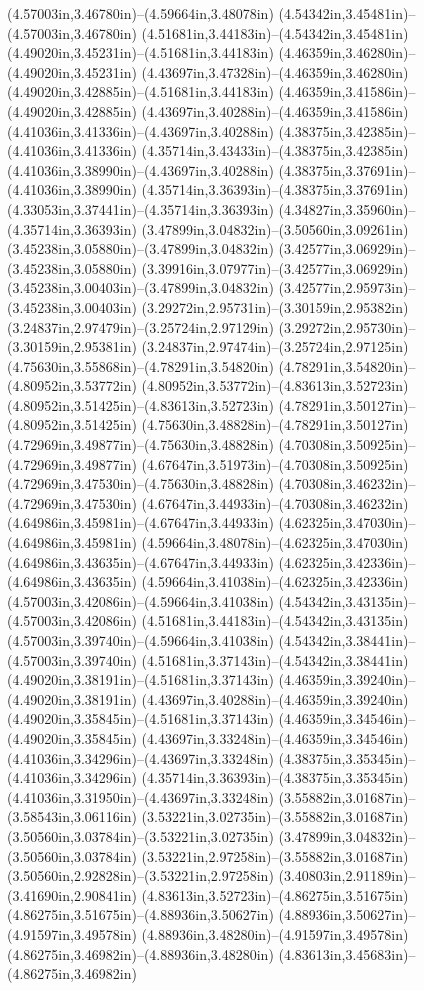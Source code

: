 (4.57003in,3.46780in)--(4.59664in,3.48078in) (4.54342in,3.45481in)--(4.57003in,3.46780in) (4.51681in,3.44183in)--(4.54342in,3.45481in) (4.49020in,3.45231in)--(4.51681in,3.44183in) (4.46359in,3.46280in)--(4.49020in,3.45231in) (4.43697in,3.47328in)--(4.46359in,3.46280in) (4.49020in,3.42885in)--(4.51681in,3.44183in) (4.46359in,3.41586in)--(4.49020in,3.42885in) (4.43697in,3.40288in)--(4.46359in,3.41586in) (4.41036in,3.41336in)--(4.43697in,3.40288in) (4.38375in,3.42385in)--(4.41036in,3.41336in) (4.35714in,3.43433in)--(4.38375in,3.42385in) (4.41036in,3.38990in)--(4.43697in,3.40288in) (4.38375in,3.37691in)--(4.41036in,3.38990in) (4.35714in,3.36393in)--(4.38375in,3.37691in) (4.33053in,3.37441in)--(4.35714in,3.36393in) (4.34827in,3.35960in)--(4.35714in,3.36393in) (3.47899in,3.04832in)--(3.50560in,3.09261in) (3.45238in,3.05880in)--(3.47899in,3.04832in) (3.42577in,3.06929in)--(3.45238in,3.05880in) (3.39916in,3.07977in)--(3.42577in,3.06929in) (3.45238in,3.00403in)--(3.47899in,3.04832in) (3.42577in,2.95973in)--(3.45238in,3.00403in) (3.29272in,2.95731in)--(3.30159in,2.95382in) (3.24837in,2.97479in)--(3.25724in,2.97129in) (3.29272in,2.95730in)--(3.30159in,2.95381in) (3.24837in,2.97474in)--(3.25724in,2.97125in) (4.75630in,3.55868in)--(4.78291in,3.54820in) (4.78291in,3.54820in)--(4.80952in,3.53772in) (4.80952in,3.53772in)--(4.83613in,3.52723in) (4.80952in,3.51425in)--(4.83613in,3.52723in) (4.78291in,3.50127in)--(4.80952in,3.51425in) (4.75630in,3.48828in)--(4.78291in,3.50127in) (4.72969in,3.49877in)--(4.75630in,3.48828in) (4.70308in,3.50925in)--(4.72969in,3.49877in) (4.67647in,3.51973in)--(4.70308in,3.50925in) (4.72969in,3.47530in)--(4.75630in,3.48828in) (4.70308in,3.46232in)--(4.72969in,3.47530in) (4.67647in,3.44933in)--(4.70308in,3.46232in) (4.64986in,3.45981in)--(4.67647in,3.44933in) (4.62325in,3.47030in)--(4.64986in,3.45981in) (4.59664in,3.48078in)--(4.62325in,3.47030in) (4.64986in,3.43635in)--(4.67647in,3.44933in) (4.62325in,3.42336in)--(4.64986in,3.43635in) (4.59664in,3.41038in)--(4.62325in,3.42336in) (4.57003in,3.42086in)--(4.59664in,3.41038in) (4.54342in,3.43135in)--(4.57003in,3.42086in) (4.51681in,3.44183in)--(4.54342in,3.43135in) (4.57003in,3.39740in)--(4.59664in,3.41038in) (4.54342in,3.38441in)--(4.57003in,3.39740in) (4.51681in,3.37143in)--(4.54342in,3.38441in) (4.49020in,3.38191in)--(4.51681in,3.37143in) (4.46359in,3.39240in)--(4.49020in,3.38191in) (4.43697in,3.40288in)--(4.46359in,3.39240in) (4.49020in,3.35845in)--(4.51681in,3.37143in) (4.46359in,3.34546in)--(4.49020in,3.35845in) (4.43697in,3.33248in)--(4.46359in,3.34546in) (4.41036in,3.34296in)--(4.43697in,3.33248in) (4.38375in,3.35345in)--(4.41036in,3.34296in) (4.35714in,3.36393in)--(4.38375in,3.35345in) (4.41036in,3.31950in)--(4.43697in,3.33248in) (3.55882in,3.01687in)--(3.58543in,3.06116in) (3.53221in,3.02735in)--(3.55882in,3.01687in) (3.50560in,3.03784in)--(3.53221in,3.02735in) (3.47899in,3.04832in)--(3.50560in,3.03784in) (3.53221in,2.97258in)--(3.55882in,3.01687in) (3.50560in,2.92828in)--(3.53221in,2.97258in) (3.40803in,2.91189in)--(3.41690in,2.90841in) (4.83613in,3.52723in)--(4.86275in,3.51675in) (4.86275in,3.51675in)--(4.88936in,3.50627in) (4.88936in,3.50627in)--(4.91597in,3.49578in) (4.88936in,3.48280in)--(4.91597in,3.49578in) (4.86275in,3.46982in)--(4.88936in,3.48280in) (4.83613in,3.45683in)--(4.86275in,3.46982in) 